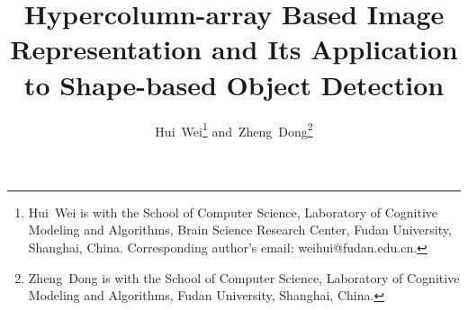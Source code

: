 \documentclass[journal]{IEEEtran}
\begin{document}
\title{Hypercolumn-array Based Image Representation and 
Its Application to Shape-based Object Detection}
\author{Hui~Wei\thanks{Hui~Wei is with the School of Computer Science, 
Laboratory of Cognitive Modeling and Algorithms, 
Brain Science Research Center, Fudan University, Shanghai, China. 
Corresponding author's email: weihui@fudan.edu.cn.}
and~Zheng~Dong\thanks{Zheng~Dong is with the School of Computer Science, 
Laboratory of Cognitive Modeling and Algorithms, 
Fudan University, Shanghai, China.}}


\maketitle
\end{document}

